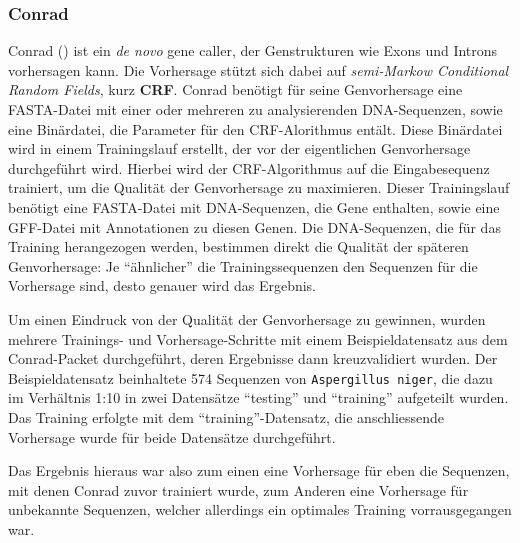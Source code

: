 \subsubsection{Conrad}
Conrad
()
ist ein \textit{de novo} gene caller, der Genstrukturen wie Exons und Introns
vorhersagen kann.
 
Die Vorhersage stützt sich dabei auf \textit{semi-Markow Conditional Random
Fields}, kurz \textbf{CRF}.  %
  
Conrad benötigt für seine Genvorhersage eine FASTA-Datei mit einer oder
mehreren zu analysierenden DNA-Sequenzen, sowie eine Binärdatei, die Parameter
für den CRF-Alorithmus entält.
Diese Binärdatei wird in einem Trainingslauf erstellt, der vor der
eigentlichen Genvorhersage durchgeführt wird. Hierbei wird der CRF-Algorithmus
auf die Eingabesequenz trainiert, um die Qualität der Genvorhersage
zu maximieren. Dieser Trainingslauf benötigt eine FASTA-Datei mit
DNA-Sequenzen, die Gene enthalten, sowie eine GFF-Datei mit Annotationen zu
diesen Genen.
Die DNA-Sequenzen, die für das Training herangezogen werden, bestimmen direkt
die Qualität der späteren Genvorhersage:
Je \enquote{ähnlicher} die Trainingssequenzen den Sequenzen für die
Vorhersage sind, desto genauer wird das Ergebnis.
\citep{doherty_gene_2007}

Um einen Eindruck von der Qualität der Genvorhersage zu gewinnen, wurden
mehrere Trainings- und Vorhersage-Schritte mit einem Beispieldatensatz aus dem
Conrad-Packet durchgeführt, deren Ergebnisse dann kreuzvalidiert wurden.
Der Beispieldatensatz beinhaltete 574 Sequenzen von \texttt{Aspergillus niger},
die dazu im Verhältnis 1:10 in zwei Datensätze \enquote{testing} und
\enquote{training} aufgeteilt wurden. Das Training erfolgte mit dem
\enquote{training}-Datensatz, die anschliessende Vorhersage wurde für beide
Datensätze durchgeführt.

Das Ergebnis hieraus war also zum einen eine Vorhersage für eben die Sequenzen,
mit denen Conrad zuvor trainiert wurde, zum Anderen eine Vorhersage für unbekannte
Sequenzen, welcher allerdings ein optimales Training vorrausgegangen war.

